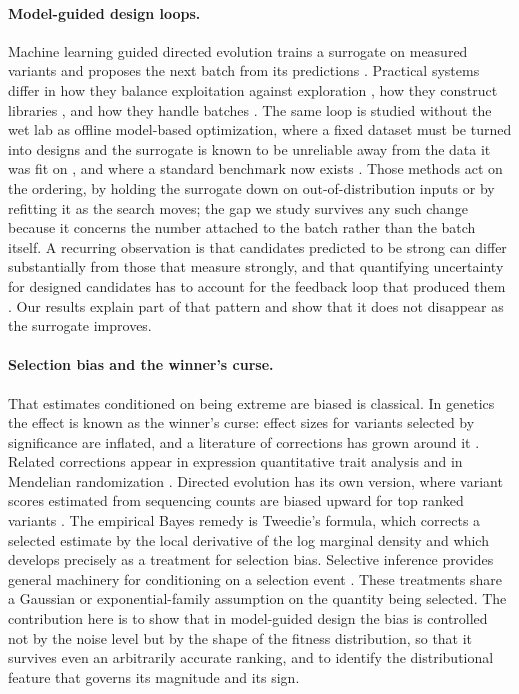 \documentclass{article}
\theoremstyle{plain}
\theoremstyle{definition}
\begin{document}
\paragraph{Model-guided design loops.}
Machine learning guided directed evolution trains a surrogate on measured variants and
proposes the next batch from its predictions \citep{yang2019machine, wu2019machine,
biswas2021low}. Practical systems differ in how they balance exploitation against
exploration \citep{hie2022adaptive, brookes2019conditioning, stanton2022accelerating}, how they construct libraries
\citep{sinai2020adalead}, and how they handle batches
\citep{angermueller2020modelbased}. The same loop is studied without the wet lab as
offline model-based optimization, where a fixed dataset must be turned into designs and
the surrogate is known to be unreliable away from the data it was fit on
\citep{trabucco2021coms, fannjiang2020autofocused}, and where a standard benchmark now
exists \citep{trabucco2022designbench}. Those methods act on the ordering, by holding
the surrogate down on out-of-distribution inputs or by refitting it as the search moves;
the gap we study survives any such change because it concerns the number attached to the
batch rather than the batch itself. A recurring observation is that candidates
predicted to be strong can differ substantially from those that measure strongly, and
that quantifying uncertainty for designed candidates has to account for the feedback
loop that produced them \citep{hsu2022learning, fannjiang2022conformal}. Our results explain part of that
pattern and show that it does not disappear as the surrogate improves.

\paragraph{Selection bias and the winner's curse.}
That estimates conditioned on being extreme are biased is classical.
In genetics the effect is known as the winner's curse: effect sizes for variants
selected by significance are inflated, and a literature of corrections has grown around
it \citep{goring2001large, zollner2007overcoming, zhong2008bias, palmer2017statistical,
forde2023review}. Related corrections appear in expression quantitative trait analysis
\citep{huang2018bootstrapqtl} and in Mendelian randomization
\citep{sadreev2021empirical}. Directed evolution has its own version, where variant
scores estimated from sequencing counts are biased upward for top ranked variants
\citep{nemoto2023acides}. The empirical Bayes remedy is Tweedie's formula, which
corrects a selected estimate by the local derivative of the log marginal density and
which \citet{efron2011tweedie} develops precisely as a treatment for selection bias.
Selective inference provides general machinery for
conditioning on a selection event \citep{benjamini2005false, taylor2015statistical,
tibshirani2016exact, fithian2014optimal}. These treatments share a Gaussian or
exponential-family assumption on the quantity being selected. The contribution here is
to show that in model-guided design the bias is controlled not by the noise level but by
the shape of the fitness distribution, so that it survives even an arbitrarily accurate
ranking, and to identify the distributional feature that governs its magnitude and its
sign.
\end{document}
